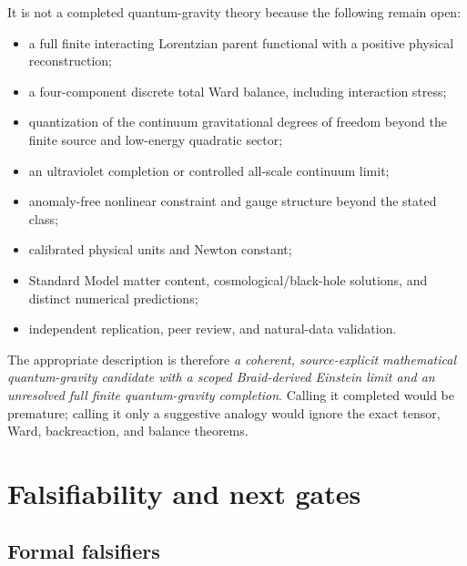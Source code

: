 \documentclass[11pt]{article}
\theoremstyle{definition}
\theoremstyle{remark}
\begin{document}
It is not a completed quantum-gravity theory because the following remain open:
\begin{itemize}
\item a full finite interacting Lorentzian parent functional with a positive physical reconstruction;
\item a four-component discrete total Ward balance, including interaction stress;
\item quantization of the continuum gravitational degrees of freedom beyond the finite source and low-energy quadratic sector;
\item an ultraviolet completion or controlled all-scale continuum limit;
\item anomaly-free nonlinear constraint and gauge structure beyond the stated class;
\item calibrated physical units and Newton constant;
\item Standard Model matter content, cosmological/black-hole solutions, and distinct numerical predictions;
\item independent replication, peer review, and natural-data validation.
\end{itemize}

The appropriate description is therefore \emph{a coherent, source-explicit mathematical quantum-gravity candidate with a scoped Braid-derived Einstein limit and an unresolved full finite quantum-gravity completion}. Calling it completed would be premature; calling it only a suggestive analogy would ignore the exact tensor, Ward, backreaction, and balance theorems.

\section{Falsifiability and next gates}

\subsection{Formal falsifiers}
\end{document}
